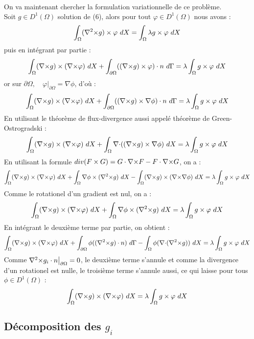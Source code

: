 On va maintenant chercher la formulation variationnelle de ce problème.\\
Soit $g\in D^1(\Omega)$ solution de (6), alors pour tout $\varphi\in D^1(\Omega)$ nous avons :
\[
\int_\Omega ({\nabla^2\times} g)\times\varphi\ dX = \int_\Omega\lambda g\times \varphi\ dX
\]
puis en intégrant par partie :
\[
\int_\Omega (\rot g)\times (\rot\varphi)\ dX + \int_{\partial\Omega} ((\rot g)\times \varphi)\cdot n\ d\Gamma = \lambda\int_\Omega g\times \varphi\ dX
\]
or sur $\partial\Omega,\quad \varphi\big\rvert_{\partial\Omega}=\nabla\phi$, d'où : 
\[
\int_\Omega (\rot g)\times (\rot\varphi)\ dX + \int_{\partial\Omega} ((\rot g)\times \nabla\phi)\cdot n\ d\Gamma = \lambda\int_\Omega g\times \varphi\ dX
\]
En utilisant le théorème de flux-divergence aussi appelé théorème de Green-Ostrogradski :
\[
\int_\Omega ({\nabla\times} g)\times ({\nabla\times}\varphi)\ dX + \int_\Omega {\nabla\cdot}(({\nabla\times} g)\times \nabla\phi)\ dX = \lambda\int_\Omega g\times \varphi\ dX
\]
En utilisant la formule $div(F\times G) = G\cdot {\nabla\times} F - F\cdot {\nabla\times} G$, on a :
\[
\int_\Omega ({\nabla\times} g)\times ({\nabla\times}\varphi)\ dX + \int_\Omega \nabla\phi\times({\nabla^2\times} g)\ dX -\int_\Omega ({\nabla\times} g)\times ({\nabla\times}\nabla\phi)\ dX  = \lambda\int_\Omega g\times \varphi\ dX
\]
Comme le rotationel d'un gradient est nul, on a :
\[
\int_\Omega ({\nabla\times} g)\times ({\nabla\times}\varphi)\ dX + \int_\Omega \nabla\phi\times({\nabla^2\times} g)\ dX  = \lambda\int_\Omega g\times \varphi\ dX
\]
En intégrant le deuxième terme par partie, on obtient : 
\[
\int_\Omega ({\nabla\times} g)\times ({\nabla\times}\varphi)\ dX + \int_{\partial\Omega} \phi(({\nabla^2\times} g)\cdot n)\ d\Gamma - \int_\Omega \phi({\nabla\cdot}({\nabla^2\times} g))\ dX  = \lambda\int_\Omega g\times \varphi\ dX
\]
Comme ${\nabla^2\times}  g_i\cdot n\big\rvert_{\partial\Omega} = 0$, le deuxième terme s'annule et comme la divergence d'un rotationel est nulle, le troisième terme s'annule aussi, ce qui laisse pour tous $\phi\in D^1(\Omega)$ :
\begin{eqnarray}
\label{fveigen}
\int_\Omega ({\nabla\times} g)\times ({\nabla\times}\varphi)\ dX = \lambda\int_\Omega g\times \varphi\ dX
\end{eqnarray}

\subsection{Décomposition des $g_i$}
\label{decomp}

